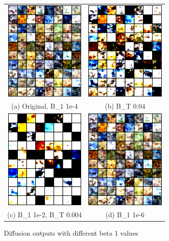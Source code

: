 \documentclass[conference]{IEEEtran}
\begin{document}
\begin{figure}
  \begin{tabular}{cc}
    \includegraphics[width=40mm]{./images/output/original.png} 
&   \includegraphics[width=40mm]{./images/output/bt1e-2.png} 
\\
  (a) Original, B\_1 1e-4 
  & (b) B\_T 0.04 \\[6pt]
      \includegraphics[width=40mm]{./images/output/bt1e-2_004.png} 
  &  \includegraphics[width=40mm]{./images/output/b1-1e-6.png} 
\\
  (c) B\_1 1e-2, B\_T 0.004 & (d) B\_1 1e-6 \\[6pt]
  \end{tabular}
  \caption{Diffusion outputs with different beta 1 values}
\end{figure}
\end{document}

